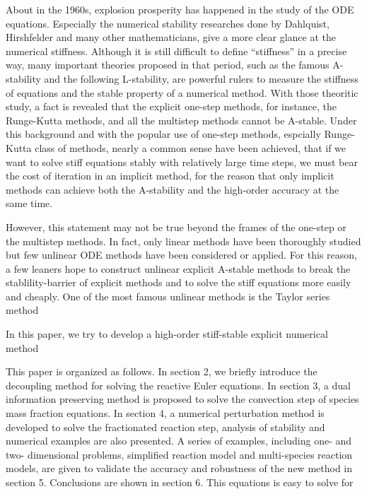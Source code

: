 \documentclass[review]{elsarticle}
\theoremstyle{plain}\newtheorem{definition}{\sc{Definition}}
\theoremstyle{defination}\newtheorem{example}{Example}[section]
\numberwithin{equation}{section}
\numberwithin{table}{section}
\begin{document}
{  About in the 1960s, explosion prosperity has happened in the study of the ODE equations. Especially the numerical stability researches done by Dahlquist, Hirshfelder and many other mathematicians, give a more clear glance at the numerical stiffness. Although it is still  difficult to define ``stiffness'' in a precise way, many important theories proposed in that period, such as the famous A-stability\cite{Germund1963A} and the following L-stability\cite{ehle1969pade}, are powerful rulers to measure the stiffness of equations and the stable property of a numerical method. With those theoritic study, a fact is revealed that the explicit one-step methods, for instance, the Runge-Kutta methods, and all the multistep methods cannot be A-stable. Under this background and with the popular use of one-step methods, espcially Runge-Kutta class of methods, nearly a common sense have been achieved, that if we want to solve stiff equations stably  with relatively large time steps, we must bear the cost of iteration in an implicit method, for the reason that only implicit methods can achieve both  the A-stability and the  high-order accuracy at the same time.  

However, this statement may not be true beyond the frames of the  one-step or the multistep methods. In fact, only linear methods have been thoroughly studied but few unlinear ODE methods have been considered or applied. For this reason, a few leaners hope to construct unlinear explicit A-stable methods to break the stablility-barrier of explicit methods  and to  solve the stiff equations more easily and cheaply.  One  of the most famous  unlinear methods is the Taylor series method 





 In this paper, we try to develop a high-order stiff-stable explicit numerical method 

This paper is organized as follows. In section 2, we briefly introduce the decoupling method for solving the reactive Euler equations. In section 3, a dual information preserving method is proposed to solve the convection step of species mass fraction equations. In section 4, a numerical perturbation method is developed to solve the fractionated reaction step, analysis of stability and numerical examples are also presented. A series of examples, including one- and two- dimensional problems, simplified reaction model and multi-species reaction models, are given to validate the accuracy and robustness of the new method in section 5. Conclusions are shown in section 6.
This equations is easy to solve for  


}
\end{document}
